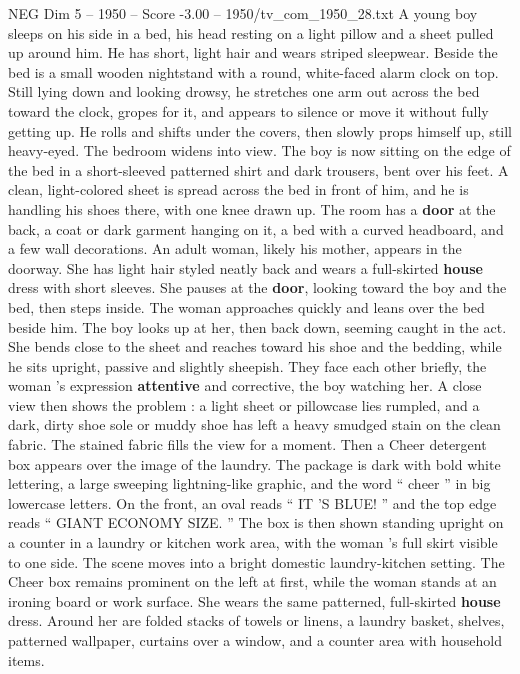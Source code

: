 \begin{textsample}{NEG Dim 5 – 1950 – Score -3.00 – 1950/tv\_com\_1950\_28.txt}  \label{ex:f5_neg_022}
A young boy sleeps on his side in a bed, his head resting on a light pillow and a sheet pulled up around him.
He has short, light hair and wears striped sleepwear.
Beside the bed is a small wooden nightstand with a round, white-faced alarm clock on top.
Still lying down and looking drowsy, he stretches one arm out across the bed toward the clock, gropes for it, and appears to silence or move it without fully getting up.
He rolls and shifts under the covers, then slowly props himself up, still heavy-eyed.
The bedroom widens into view.
The boy is now sitting on the edge of the bed in a short-sleeved patterned shirt and dark trousers, bent over his feet.
A clean, light-colored sheet is spread across the bed in front of him, and he is handling his shoes there, with one knee drawn up.
The room has a \textbf{door} at the back, a coat or dark garment hanging on it, a bed with a curved headboard, and a few wall decorations.
An adult woman, likely his mother, appears in the doorway.
She has light hair styled neatly back and wears a full-skirted \textbf{house} dress with short sleeves.
She pauses at the \textbf{door}, looking toward the boy and the bed, then steps inside.
The woman approaches quickly and leans over the bed beside him.
The boy looks up at her, then back down, seeming caught in the act.
She bends close to the sheet and reaches toward his shoe and the bedding, while he sits upright, passive and slightly sheepish.
They face each other briefly, the woman ’s expression \textbf{attentive} and corrective, the boy watching her.
A close view then shows the problem : a light sheet or pillowcase lies rumpled, and a dark, dirty shoe sole or muddy shoe has left a heavy smudged stain on the clean fabric.
The stained fabric fills the view for a moment.
Then a Cheer detergent box appears over the image of the laundry.
The package is dark with bold white lettering, a large sweeping lightning-like graphic, and the word “ cheer ” in big lowercase letters.
On the front, an oval reads “ IT ’S BLUE! ” and the top edge reads “ GIANT ECONOMY SIZE. ” The box is then shown standing upright on a counter in a laundry or kitchen work area, with the woman ’s full skirt visible to one side.
The scene moves into a bright domestic laundry-kitchen setting.
The Cheer box remains prominent on the left at first, while the woman stands at an ironing board or work surface.
She wears the same patterned, full-skirted \textbf{house} dress.
Around her are folded stacks of towels or linens, a laundry basket, shelves, patterned wallpaper, curtains over a window, and a counter area with household items.

\end{textsample}
